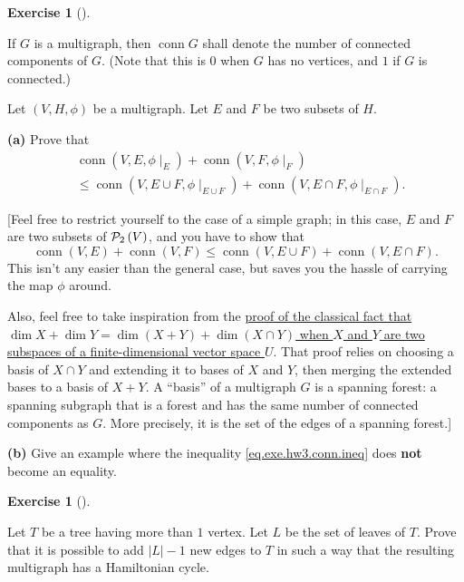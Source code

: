 \documentclass[numbers=enddot,12pt,final,onecolumn,notitlepage]{scrartcl}%
\newcounter{exer}
\theoremstyle{definition}
\newtheorem{exmp}[exer]{Exercise}
\newenvironment{exercise}[1][]
{\begin{exmp}[#1]\begin{leftbar}}
{\end{leftbar}\end{exmp}}
\newcommand{\powset}[2][]{\ifthenelse{\equal{#2}{}}{\mathcal{P}\left(#1\right)}{\mathcal{P}_{#1}\left(#2\right)}}
\newcommand{\abs}[1]{\left| #1 \right|}
\newcommand{\tup}[1]{\left( #1 \right)}
\begin{document}
\begin{exercise} \label{exe.hw3.conn}
If $G$ is a multigraph, then $\operatorname{conn} G$ shall denote the
number of connected components of $G$. (Note that this is $0$ when $G$
has no vertices, and $1$ if $G$ is connected.)

Let $\tup{V, H, \phi}$ be a multigraph. Let $E$ and $F$ be two
subsets of $H$.

\textbf{(a)} Prove that
\begin{align}
& \operatorname{conn} \tup{V, E, \phi\mid_E}
+ \operatorname{conn} \tup{V, F, \phi\mid_F} \nonumber \\
& \leq
\operatorname{conn} \tup{V, E \cup F, \phi\mid_{E \cup F}}
+ \operatorname{conn} \tup{V, E \cap F, \phi\mid_{E \cap F}} .
\label{eq.exe.hw3.conn.ineq}
\end{align}

[Feel free to restrict yourself to the case of a simple graph; in this
case, $E$ and $F$ are two subsets of $\powset[2]{V}$, and you have to
show that
\[
\operatorname{conn} \tup{V, E} + \operatorname{conn} \tup{V, F}
\leq \operatorname{conn} \tup{V, E \cup F}
+ \operatorname{conn} \tup{V, E \cap F} .
\]
This isn't any easier than the general case, but saves you the hassle
of carrying the map $\phi$ around.

Also, feel free to take inspiration from the
\href{http://math.stackexchange.com/questions/500511/dimension-of-the-sum-of-two-vector-subspaces}{proof
of the classical fact that
$\dim X + \dim Y = \dim \tup{X + Y} + \dim \tup{X \cap Y}$ when $X$
and $Y$ are two subspaces of a finite-dimensional vector space $U$}.
That proof relies on choosing a basis of $X \cap Y$ and extending it
to bases of $X$ and $Y$, then merging the extended bases to a basis of
$X + Y$. A ``basis'' of a multigraph $G$ is a spanning forest: a
spanning subgraph that is a forest and has the same number of
connected components as $G$. More precisely, it is the set of the
edges of a spanning forest.]

\textbf{(b)} Give an example where the inequality
\eqref{eq.exe.hw3.conn.ineq} does \textbf{not} become an equality.
\end{exercise}

\begin{exercise} \label{exe.hw3.whamilton}
Let $T$ be a tree having more than $1$ vertex.
Let $L$ be the set of leaves of $T$. Prove that it
is possible to add $\abs{L}-1$ new edges to $T$ in such a way that
the resulting multigraph has a Hamiltonian cycle.
\end{exercise}
\end{document}

